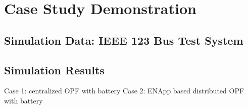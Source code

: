 \documentclass{article}
\begin{document}
\section{Case Study Demonstration}

\subsection{Simulation Data: IEEE 123 Bus Test System}

\subsection{Simulation Results}
Case 1: centralized OPF with battery
Case 2: ENApp based distributed OPF with battery
\end{document}
